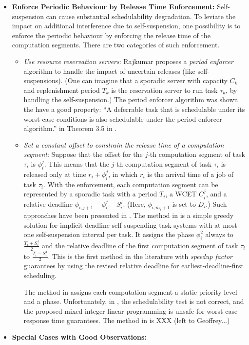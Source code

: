 \begin{itemize}
\item {\bf Enforce Periodic Behaviour by Release Time Enforcement:}   Self-suspension can cause substantial schedulability degradation. To leviate the impact on additional interference due to self-suspension, one possibility is to enforce the periodic behaviour by enforcing the release time of the computation segments. There are two categories of such enforcement. 
  \begin{itemize}
  \item {\it Use resource reservation servers}: Rajkumar \cite{Raj:suspension1991} proposes a \emph{period enforcer} algorithm to handle the impact of uncertain releases (like self-suspensions).  (One can imagine that a sporadic server \cite{RTSS-SpruntLS88} with capacity $C_k$ and replenishment period $T_k$ is the reservation server to run task $\tau_k$, by handling the self-suspension.) The period enforcer algorithm was shown the have a good property: ``A deferrable task that is schedulable under its worst-case conditions is also schedulable under the period enforcer algorithm.'' in Theorem 3.5 in \cite{Raj:suspension1991}. 
  \item {\it Set a constant offset to constrain the release time of a computation segment}: Suppose that the offset for the $j$-th computation segment of task $\tau_i$ is $\phi_i^j$. This means that the $j$-th computation segment of task $\tau_i$ is released only at time $r_i+\phi_i^j$, in which $r_i$ is the arrival time of a job of task $\tau_i$. With the enforcement, each computation segment can be represented by a sporadic task with a period $T_i$, a WCET $C_i^j$, and a relative deadline $\phi_{i,j+1}-\phi_i^j-S_i^j$. (Here, $\phi_{i,m_i+1}$ is set to $D_i$.) Such approaches have been presented in \cite{RTSS-KimANR13,LR:rtas10,RTSS-ChenL14}. The method in \cite{RTSS-ChenL14} is a simple greedy solution for implicit-deadline self-suspending task systems with at most one self-suspension interval per task. It assigns the phase $\phi_i^2$ always to $\frac{T_i+S_i^1}{2}$ and the relative deadline of the first computation segment of task $\tau_i$ to $\frac{T_i-S_i^1}{2}$. This is the first method in the literature with \emph{speedup factor} guarantees by using the revised relative deadline for earliest-deadline-first scheduling. 


The method in \cite{RTSS-KimANR13} assigns each computation segment a static-priority level and a phase. Unfortunately,  in \cite{RTSS-KimANR13}, the schedulability test is not correct, and the proposed mixed-integer linear programming is unsafe for worst-case response time guarantees. The method in \cite{LR:rtas10} is XXX (left to Geoffrey...)
  \end{itemize}
\item {\bf Special Cases with Good Observations:}
\end{itemize}


